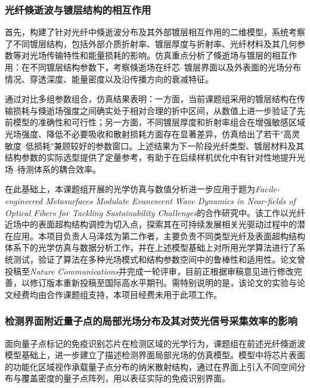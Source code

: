 \documentclass[12pt,a4paper]{article}
\begin{document}
\subsubsection{光纤倏逝波与镀层结构的相互作用}

首先，构建了针对光纤中倏逝波分布及其外部镀层相互作用的二维模型，系统考察了不同镀层结构，包括外部介质折射率、镀层厚度与折射率、光纤材料及其几何参数等对光场传输特性和能量损耗的影响。仿真重点分析了倏逝场与镀层的相互作用：在不同镀层结构参数下，考察倏逝场在纤芯--镀层界面以及外表面的光场分布情况、穿透深度、能量密度以及沿传播方向的衰减特征。

通过对比多组参数组合，仿真结果表明：一方面，当前课题组采用的镀层结构在传输损耗与倏逝场强度之间确实处于相对合理的折中区间，从数值上进一步验证了先前模型的准确性和可行性；另一方面，不同镀层厚度和折射率组合在增强敏感区域光场强度、降低不必要吸收和散射损耗方面存在显著差异，仿真给出了若干"高灵敏度--低损耗"兼顾较好的参数窗口。上述结果为下一阶段光纤类型、镀层材料及其结构参数的实际选型提供了定量参考，有助于在后续样机优化中有针对性地提升光场--待测体系的耦合效率。

在此基础上，本课题组开展的光学仿真与数值分析进一步应用于题为\textit{Facile-engineered Metasurfaces Modulate Evanescent Wave Dynamics in Near-fields of Optical Fibers for Tackling Sustainability Challenges}的合作研究中。该工作以光纤近场中的表面超构结构调控为切入点，探索其在可持续发展相关光驱动过程中的潜在应用。本项目负责人马泽炫为第二作者，主要负责不同类型光纤及表面超构结构体系下的光学仿真与数据分析工作，并在上述模型基础上对所用光学算法进行了系统测试，验证了算法在多种光场模式和结构参数空间中的鲁棒性和适用性。论文曾投稿至\textit{Nature Communications}并完成一轮评审，目前正根据审稿意见进行修改完善，以修订版本重新投稿至国际高水平期刊。需特别说明的是，该论文的实验与论文经费均由合作课题组支持，本项目经费未用于此项工作。

\subsubsection{检测界面附近量子点的局部光场分布及其对荧光信号采集效率的影响}

面向量子点标记的免疫识别芯片在检测区域的光学行为，课题组在前述光纤倏逝波模型基础上，进一步建立了描述检测界面局部光场的仿真模型。模型中将芯片表面的功能化区域视作承载量子点分布的纳米散射结构，通过在界面上引入不同空间分布与覆盖密度的量子点阵列，用以表征实际的免疫识别界面。
\end{document}
